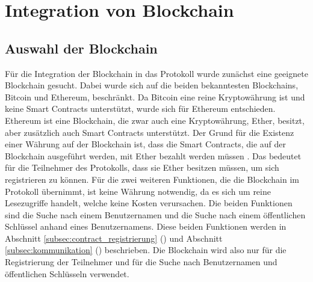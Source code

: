 \section{Integration von Blockchain}
\label{sec:blockchainintegration}


\subsection{Auswahl der Blockchain}
Für die Integration der Blockchain in das Protokoll wurde zunächst eine geeignete Blockchain gesucht. Dabei wurde sich auf die beiden bekanntesten Blockchains, Bitcoin und Ethereum, beschränkt. Da Bitcoin eine reine Kryptowährung ist und keine Smart Contracts unterstützt, wurde sich für Ethereum entschieden. Ethereum ist eine Blockchain, die zwar auch eine Kryptowährung, Ether, besitzt, aber zusätzlich auch Smart Contracts unterstützt. Der Grund für die Existenz einer Währung auf der Blockchain ist, dass die Smart Contracts, die auf der Blockchain ausgeführt werden, mit Ether bezahlt werden müssen \parencite[S. 2]{Antonopoulos_MasteringEthereum}. Das bedeutet für die Teilnehmer des Protokolls, dass sie Ether besitzen müssen, um sich registrieren zu können. Für die zwei weiteren Funktionen, die die Blockchain im Protokoll übernimmt, ist keine Währung notwendig, da es sich um reine Lesezugriffe handelt, welche keine Kosten verursachen. Die beiden Funktionen sind die Suche nach einem Benutzernamen und die Suche nach einem öffentlichen Schlüssel anhand eines Benutzernamens. Diese beiden Funktionen werden in Abschnitt \ref{subsec:contract_registrierung} () und Abschnitt \ref{subsec:kommunikation} () beschrieben. Die Blockchain wird also nur für die Registrierung der Teilnehmer und für die Suche nach Benutzernamen und öffentlichen Schlüsseln verwendet.


